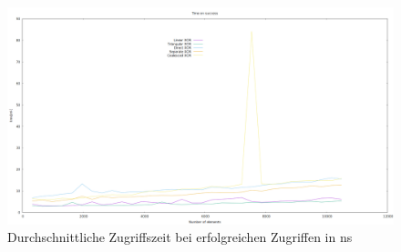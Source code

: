 \begin{figure}[h!]
    \includegraphics[width=0.7\paperwidth]{Bilder/successful_time_part.png}
    \caption{Durchschnittliche Zugriffszeit bei erfolgreichen Zugriffen in ns}
\end{figure}
\FloatBarrier